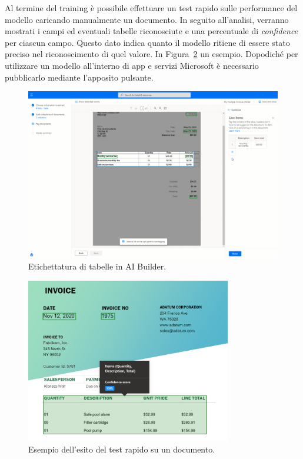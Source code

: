 Al termine del training è possibile effettuare un test rapido sulle performance del modello caricando manualmente un documento. In seguito all'analisi, verranno mostrati i campi ed eventuali tabelle riconosciute e una percentuale di \textit{confidence} per ciascun campo. Questo dato indica quanto il modello ritiene di essere stato preciso nel riconoscimento di quel valore. In Figura~\ref{fig:aiBuilderTest} un esempio.
Dopodiché per utilizzare un modello all'interno di app e servizi Microsoft è necessario pubblicarlo mediante l'apposito pulsante.

\begin{figure}[ht!]
  \centering
  \includegraphics[width=\textwidth]{ai-builder-tables.png}
  \caption{Etichettatura di tabelle in AI Builder.}
  \label{fig:aiBuilderTables}
\end{figure}

\begin{figure}[ht!]
  \centering
  \includegraphics[width=0.8\textwidth]{ai-builder-test.png}
  \caption{Esempio dell'esito del test rapido su un documento.}
  \label{fig:aiBuilderTest}
\end{figure}

